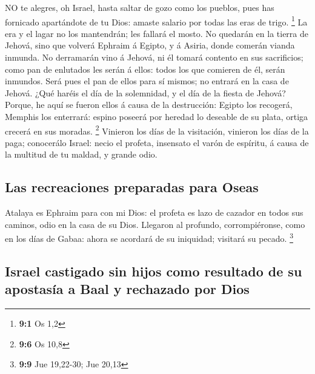  NO te alegres, oh Israel, hasta saltar de gozo como los
pueblos, pues has fornicado apartándote de tu Dios: amaste salario por
todas las eras de trigo. \footnote{\textbf{9:1} Os 1,2}  La
era y el lagar no los mantendrán; les fallará el mosto.  No
quedarán en la tierra de Jehová, sino que volverá Ephraim á Egipto, y á
Asiria, donde comerán vianda inmunda.  No derramarán vino á
Jehová, ni él tomará contento en sus sacrificios; como pan de enlutados
les serán á ellos: todos los que comieren de él, serán inmundos. Será
pues el pan de ellos para sí mismos; no entrará en la casa de Jehová.
 ¿Qué haréis el día de la solemnidad, y el día de la fiesta
de Jehová?  Porque, he aquí se fueron ellos á causa de la
destrucción: Egipto los recogerá, Memphis los enterrará: espino poseerá
por heredad lo deseable de su plata, ortiga crecerá en sus moradas.
\footnote{\textbf{9:6} Os 10,8}  Vinieron los días de la
visitación, vinieron los días de la paga; conocerálo Israel: necio el
profeta, insensato el varón de espíritu, á causa de la multitud de tu
maldad, y grande odio.

\hypertarget{las-recreaciones-preparadas-para-oseas}{%
\subsection{Las recreaciones preparadas para
Oseas}\label{las-recreaciones-preparadas-para-oseas}}

 Atalaya es Ephraim para con mi Dios: el profeta es lazo de
cazador en todos sus caminos, odio en la casa de su Dios. 
Llegaron al profundo, corrompiéronse, como en los días de Gabaa: ahora
se acordará de su iniquidad; visitará su pecado. \footnote{\textbf{9:9}
  Jue 19,22-30; Jue 20,13}

\hypertarget{israel-castigado-sin-hijos-como-resultado-de-su-apostasuxeda-a-baal-y-rechazado-por-dios}{%
\subsection{Israel castigado sin hijos como resultado de su apostasía a
Baal y rechazado por
Dios}\label{israel-castigado-sin-hijos-como-resultado-de-su-apostasuxeda-a-baal-y-rechazado-por-dios}}

